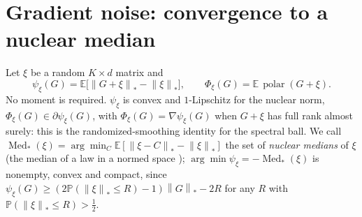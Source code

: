 \documentclass[11pt]{article}
\theoremstyle{remark}
\newcommand{\E}{\mathbb{E}}
\newcommand{\Prob}{\mathbb{P}}
\newcommand{\nnuc}[1]{\left\|#1\right\|_{*}}
\newcommand{\polar}{\operatorname{polar}}
\newcommand{\Med}{\operatorname{Med}_\ast}
\begin{document}
\section{Gradient noise: convergence to a nuclear median}\label{sec:noise}

Let $\xi$ be a random $K\times d$ matrix and
\[
\psi_\xi(G)=\E\big[\nnuc{G+\xi}-\nnuc\xi\big],\qquad \Phi_\xi(G)=\E\,\polar(G+\xi).
\]
No moment is required. $\psi_\xi$ is convex and $1$-Lipschitz for the nuclear norm, $\Phi_\xi(G)\in\partial\psi_\xi(G)$,
with $\Phi_\xi(G)=\nabla\psi_\xi(G)$ when $G+\xi$ has full rank almost surely: this is the randomized-smoothing identity
\cite{duchi2012randomized,abernethy2014online,duboistaine2022fast,jiang2026adaptive} for the spectral ball. We call
$\Med(\xi)=\arg\min_C\E[\nnuc{\xi-C}-\nnuc\xi]$ the set of \emph{nuclear medians} of $\xi$ (the median of a law in a
normed space \cite{minsker2015geometric}); $\arg\min\psi_\xi=-\Med(\xi)$ is nonempty, convex and compact, since
$\psi_\xi(G)\ge(2\Prob(\nnuc\xi\le R)-1)\nnuc G-2R$ for any $R$ with $\Prob(\nnuc\xi\le R)>\frac12$.
\end{document}
